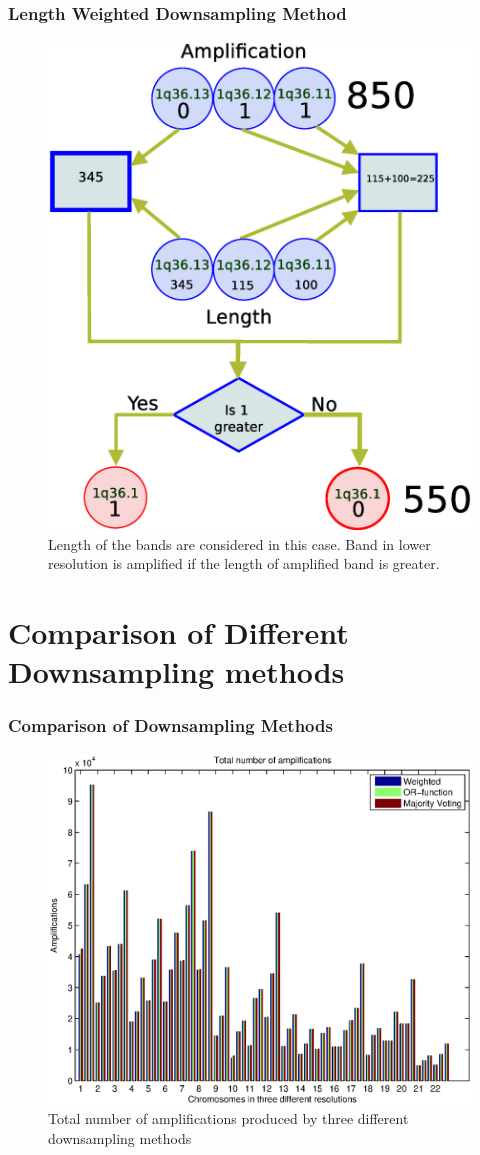 \documentclass[dvips]{beamer}
\begin{document}
\begin{frame}
\frametitle{Length Weighted Downsampling Method}
\begin{figure}
\includegraphics[scale=0.2]{figures/weighted}
\caption{Length of the bands are considered in this case. Band in lower resolution is amplified if the length of amplified band is greater.}
\end{figure}
\end{frame}

\section[Comparison]{Comparison of Different Downsampling methods}
\begin{frame}
\frametitle{Comparison of Downsampling Methods}
\begin{figure}
\includegraphics[height=5.3 cm]{figures/totalamp}
\caption{Total number of amplifications produced by three different downsampling methods}
\end{figure}
\end{frame}
\end{document}

